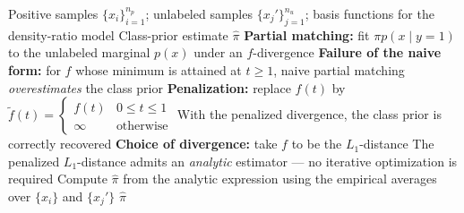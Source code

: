 \documentclass{article}
\begin{document}
\begin{algorithm}[!h]
\renewcommand{\algorithmicrequire}{\textbf{Input:}}
\renewcommand{\algorithmicensure}{\textbf{Output:}}
	\caption{pen-L1 (class-prior estimation via penalized $L_{1}$-distance)}
	\begin{algorithmic}[1]
	    \REQUIRE
	    Positive samples $\{x_{i}\}_{i=1}^{n_{p}}$; unlabeled samples $\{x_{j}'\}_{j=1}^{n_{u}}$;
	    basis functions for the density-ratio model
	    \ENSURE
	    Class-prior estimate $\hat{\pi}$
	    \STATE \textbf{Partial matching:} fit $\pi p(x\mid y=1)$ to the unlabeled marginal $p(x)$
	    under an $f$-divergence %
	    \STATE \textbf{Failure of the naive form:} for $f$ whose minimum is attained at $t\geq 1$,
	    naive partial matching \emph{overestimates} the class prior %
	    \STATE \textbf{Penalization:} replace $f(t)$ by
	    $\tilde{f}(t)=\begin{cases} f(t) & 0\leq t\leq 1\\ \infty & \text{otherwise}\end{cases}$ %
	    \STATE \quad With the penalized divergence, the class prior is correctly recovered
	    \STATE \textbf{Choice of divergence:} take $f$ to be the $L_{1}$-distance
	    \STATE \quad The penalized $L_{1}$-distance admits an \emph{analytic} estimator ---
	    no iterative optimization is required %
	    \STATE Compute $\hat{\pi}$ from the analytic expression using the empirical averages
	    over $\{x_{i}\}$ and $\{x_{j}'\}$
		\RETURN $\hat{\pi}$
	\end{algorithmic}
\end{algorithm}
\end{document}
